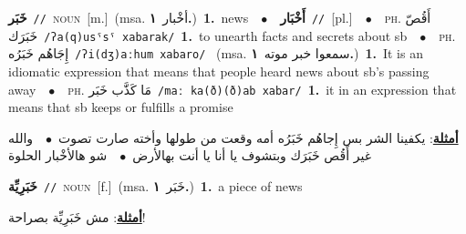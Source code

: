 \documentclass[10pt,a4paper,twoside]{article} %
\begin{document}
\begin{multicols}{2}
{{\setlength\topsep{0pt}\textbf{\foreignlanguage{arabic}{خَبَر}}\ {\color{gray}\texttt{//}\color{black}}\ \textsc{noun}\ [m.]\ \color{gray}(msa. \foreignlanguage{arabic}{أخْبار}~\foreignlanguage{arabic}{\textbf{١.}})\color{black}\ \textbf{1.}~news\ \ $\bullet$\ \ \setlength\topsep{0pt}\textbf{\foreignlanguage{arabic}{أَخْبَار}}\ {\color{gray}\texttt{//}\color{black}}\ [pl.]\ \ $\bullet$\ \ \textsc{ph.} \color{gray} \foreignlanguage{arabic}{أَقُصّ خَبَرَك}\color{black}\ {\color{gray}\texttt{/{\sffamily ʔa(q)usˤsˤ xabarak}/}\color{black}}\ \textbf{1.}~to unearth facts and secrets about sb\ \ $\bullet$\ \ \textsc{ph.} \color{gray} \foreignlanguage{arabic}{إِجَاهُم خَبَرُه}\color{black}\ {\color{gray}\texttt{/{\sffamily ʔi(dʒ)aːhum xabaro}/}\color{black}}\ \color{gray} (msa. \foreignlanguage{arabic}{سمعوا خبر موته}~\foreignlanguage{arabic}{\textbf{١.}})\color{black}\ \textbf{1.}~It is an idiomatic expression that means that people heard news about sb's passing away\ \ $\bullet$\ \ \textsc{ph.} \color{gray} \foreignlanguage{arabic}{مَا كَذَّب خَبَر}\color{black}\ {\color{gray}\texttt{/{\sffamily maː ka(ð)(ð)ab xabar}/}\color{black}}\ \textbf{1.}~it in an expression that means that sb keeps or fulfills a promise\  \begin{flushright}\color{gray}\foreignlanguage{arabic}{\textbf{\underline{\foreignlanguage{arabic}{أمثلة}}}: يكفينا الشر بس إِجاهُم خَبَرُه أمه وقعت من طولها وأخته صارت تصوت\ $\bullet$\ \  والله غير أَقُص خَبَرَك وبتشوف يا أنا يا أنت بهالأرض\ $\bullet$\ \  شو هالأخْبار الحلوة}\end{flushright}\color{black}} \vspace{2mm}

{\setlength\topsep{0pt}\textbf{\foreignlanguage{arabic}{خَبَرِيِّة}}\ {\color{gray}\texttt{//}\color{black}}\ \textsc{noun}\ [f.]\ \color{gray}(msa. \foreignlanguage{arabic}{خَبَر}~\foreignlanguage{arabic}{\textbf{١.}})\color{black}\ \textbf{1.}~a piece of news\  \begin{flushright}\color{gray}\foreignlanguage{arabic}{\textbf{\underline{\foreignlanguage{arabic}{أمثلة}}}: مش خَبَرِيِّة بصراحة!}\end{flushright}\color{black}} \vspace{2mm}

}
\end{multicols}
\end{document}
